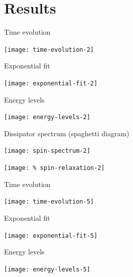 \documentclass[12pt,c]{beamer}
\begin{document}
\section{Results}

\begin{frame}{Time evolution}
  \begin{center}
    \texttt{[image: time-evolution-2]}
  \end{center}
\end{frame}

\begin{frame}{Exponential fit}
  \begin{center}
    \texttt{[image: exponential-fit-2]}
  \end{center}
\end{frame}

\begin{frame}{Energy levels}
  \begin{center}
    \texttt{[image: energy-levels-2]}
  \end{center}
\end{frame}

\begin{frame}{Dissipator spectrum (spaghetti diagram)}
  \begin{center}
    \texttt{[image: spin-spectrum-2]}
  \end{center}
\end{frame}

\begin{frame}
  \begin{center}
    \texttt{[image: \%
    spin-relaxation-2]}
  \end{center}
\end{frame}


\begin{frame}{Time evolution}
  \begin{center}
    \texttt{[image: time-evolution-5]}
  \end{center}
\end{frame}

\begin{frame}{Exponential fit}
  \begin{center}
    \texttt{[image: exponential-fit-5]}
  \end{center}
\end{frame}

\begin{frame}{Energy levels}
  \begin{center}
    \texttt{[image: energy-levels-5]}
  \end{center}
\end{frame}
\end{document}
